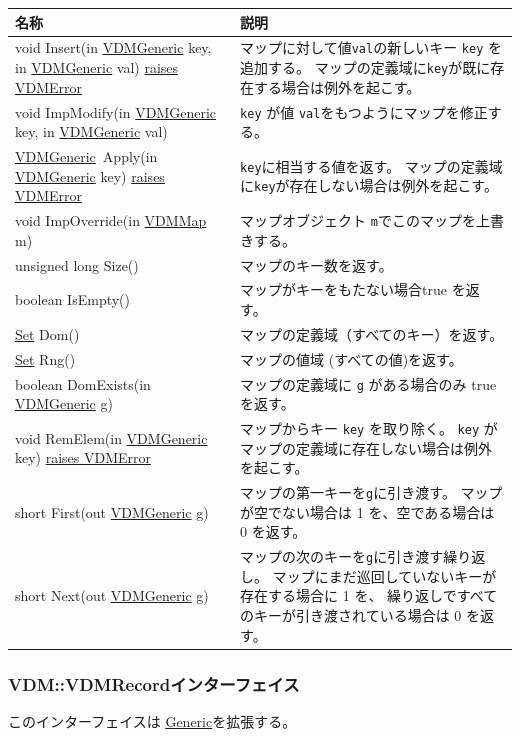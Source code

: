 \documentclass[\pformat,12pt]{jarticle}
\newcommand{\pbs}[1]{\let\temp=\\#1\let\\=\temp}
\newenvironment{interfacetable}{%
  \begin{longtable}{|>{\pbs\raggedright\ttfamily}p{6.6cm}%
                    |>{\pbs\raggedright}p{6.6cm}|} \hline
  \textrm{\bfseries 名称} &  \textbf{説明} \\ \hline
  \endhead
  }{\end{longtable}}
\newcommand{\VDMError}{\hyperlink{exception.VDMError}{raises VDMError}}
\newcommand{\VDMGeneric}{\hyperlink{interface.Generic}{VDMGeneric}}
\newcommand{\VDMMap}{\hyperlink{interface.VDMMap}{VDMMap}}
\newcommand{\Set}{\hyperlink{interface.VDMSet}{Set}}
\begin{document}
\begin{interfacetable}
void Insert(in {\VDMGeneric} key, in {\VDMGeneric} val) {\VDMError}
  & マップに対して値\texttt{val}の新しいキー \texttt{key} を追加する。
    マップの定義域に\texttt{key}が既に存在する場合は例外を起こす。
\\ \hline
void ImpModify(in {\VDMGeneric} key, in {\VDMGeneric} val)
  & \texttt{key} が値 \texttt{val}をもつようにマップを修正する。
\\ \hline
{\VDMGeneric}\ Apply(in {\VDMGeneric} key) {\VDMError}
  & \texttt{key}に相当する値を返す。
     マップの定義域に\texttt{key}が存在しない場合は例外を起こす。
\\ \hline
void ImpOverride(in {\VDMMap} m)
  & マップオブジェクト \texttt{m}でこのマップを上書きする。
\\ \hline
unsigned long Size()
  & マップのキー数を返す。
\\ \hline
boolean IsEmpty()
  & マップがキーをもたない場合true を返す。
\\ \hline
{\Set} Dom()
  & マップの定義域（すべてのキー）を返す。
\\ \hline
{\Set} Rng()
  & マップの値域 (すべての値)を返す。
\\ \hline
boolean DomExists(in {\VDMGeneric} g)
  & マップの定義域に \texttt{g} がある場合のみ true を返す。
\\ \hline
void RemElem(in {\VDMGeneric} key) {\VDMError}
  & マップからキー \texttt{key} を取り除く。
     \texttt{key} がマップの定義域に存在しない場合は例外を起こす。
\\ \hline
short First(out {\VDMGeneric} g)
  & マップの第一キーを\texttt{g}に引き渡す。
    マップが空でない場合は 1 を、空である場合は
     0 を返す。 
\\ \hline
short Next(out {\VDMGeneric} g)
  & マップの次のキーを\texttt{g}に引き渡す繰り返し。
    マップにまだ巡回していないキーが存在する場合に 1 を、
    繰り返しですべてのキーが引き渡されている場合は 0 を返す。
\\ \hline
\end{interfacetable}

\subsubsection{VDM::VDMRecordインターフェイス}
\mbox{}
このインターフェイスは \hyperlink{interface.Generic}{Generic}を拡張する。
\end{document}
